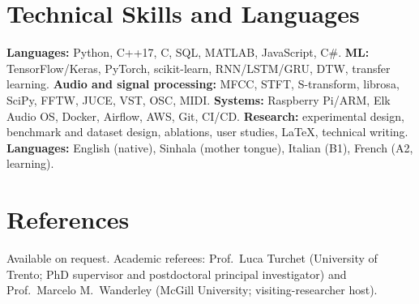 \documentclass[11pt]{article}
\begin{document}
\section*{Technical Skills and Languages}
\textbf{Languages:} Python, C++17, C, SQL, MATLAB, JavaScript, C\#. \textbf{ML:} TensorFlow/Keras, PyTorch, scikit-learn, RNN/LSTM/GRU, DTW, transfer learning. \textbf{Audio and signal processing:} MFCC, STFT, S-transform, librosa, SciPy, FFTW, JUCE, VST, OSC, MIDI. \textbf{Systems:} Raspberry Pi/ARM, Elk Audio OS, Docker, Airflow, AWS, Git, CI/CD. \textbf{Research:} experimental design, benchmark and dataset design, ablations, user studies, LaTeX, technical writing. \textbf{Languages:} English (native), Sinhala (mother tongue), Italian (B1), French (A2, learning).

\section*{References}
Available on request. Academic referees: Prof.\ Luca Turchet (University of Trento; PhD supervisor and postdoctoral principal investigator) and Prof.\ Marcelo M.\ Wanderley (McGill University; visiting-researcher host).
\end{document}

